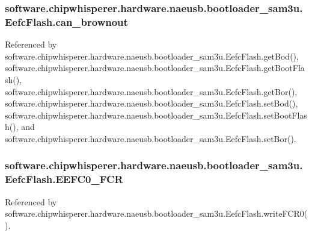 \subsubsection[{can\+\_\+brownout}]{\setlength{\rightskip}{0pt plus 5cm}software.\+chipwhisperer.\+hardware.\+naeusb.\+bootloader\+\_\+sam3u.\+Eefc\+Flash.\+can\+\_\+brownout}\label{classsoftware_1_1chipwhisperer_1_1hardware_1_1naeusb_1_1bootloader__sam3u_1_1EefcFlash_a2a7305c795772d47fd04a1f3b5bcb3ab}


Referenced by software.\+chipwhisperer.\+hardware.\+naeusb.\+bootloader\+\_\+sam3u.\+Eefc\+Flash.\+get\+Bod(), software.\+chipwhisperer.\+hardware.\+naeusb.\+bootloader\+\_\+sam3u.\+Eefc\+Flash.\+get\+Boot\+Flash(), software.\+chipwhisperer.\+hardware.\+naeusb.\+bootloader\+\_\+sam3u.\+Eefc\+Flash.\+get\+Bor(), software.\+chipwhisperer.\+hardware.\+naeusb.\+bootloader\+\_\+sam3u.\+Eefc\+Flash.\+set\+Bod(), software.\+chipwhisperer.\+hardware.\+naeusb.\+bootloader\+\_\+sam3u.\+Eefc\+Flash.\+set\+Boot\+Flash(), and software.\+chipwhisperer.\+hardware.\+naeusb.\+bootloader\+\_\+sam3u.\+Eefc\+Flash.\+set\+Bor().

\hypertarget{classsoftware_1_1chipwhisperer_1_1hardware_1_1naeusb_1_1bootloader__sam3u_1_1EefcFlash_a55482fa96af1e5eadea991bf7a7ec8ef}{}
\subsubsection[{E\+E\+F\+C0\+\_\+\+F\+C\+R}]{\setlength{\rightskip}{0pt plus 5cm}software.\+chipwhisperer.\+hardware.\+naeusb.\+bootloader\+\_\+sam3u.\+Eefc\+Flash.\+E\+E\+F\+C0\+\_\+\+F\+C\+R}\label{classsoftware_1_1chipwhisperer_1_1hardware_1_1naeusb_1_1bootloader__sam3u_1_1EefcFlash_a55482fa96af1e5eadea991bf7a7ec8ef}


Referenced by software.\+chipwhisperer.\+hardware.\+naeusb.\+bootloader\+\_\+sam3u.\+Eefc\+Flash.\+write\+F\+C\+R0().

\hypertarget{classsoftware_1_1chipwhisperer_1_1hardware_1_1naeusb_1_1bootloader__sam3u_1_1EefcFlash_a3a30b9250f919b8555a00397480fe313}{}
